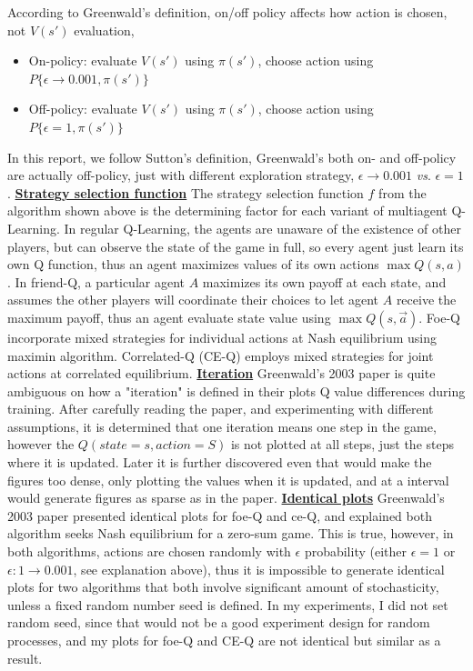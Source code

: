 \documentclass[10pt]{article}
\begin{document}
\noindent
According to Greenwald's definition\cite{GreenwaldCorrelatedQLearning2005}, on/off policy affects how action is chosen, not $V(s')$ evaluation,
\begin{itemize}
  \item On-policy: evaluate $V(s')$ using $\pi(s')$, choose action using $P\{\epsilon\rightarrow 0.001, \pi(s')\}$
  \item Off-policy: evaluate $V(s')$ using $\pi(s')$, choose action using $P\{\epsilon=1, \pi(s')\}$
\end{itemize}
 

In this report, we follow Sutton's definition, Greenwald's both on- and off-policy are actually off-policy, just with different exploration strategy, $\epsilon\rightarrow 0.001$ \textit{vs}. $\epsilon=1$.
\bigbreak
\noindent
\ul{\textbf{Strategy selection function}} The strategy selection function $f$ from the algorithm shown above is the determining factor for each variant of multiagent Q-Learning. In regular Q-Learning, the agents are unaware of the existence of other players, but can observe the state of the game in full, so every agent just learn its own Q function, thus an agent maximizes values of its own actions $\max Q(s,a)$. In friend-Q\cite{LittmanFriendorFoeQlearningGeneralSum2001}, a particular agent $A$ maximizes its own payoff at each state, and assumes the other players will coordinate their choices to let agent $A$ receive the maximum payoff, thus an agent evaluate state value using $\max Q(s,\vec{a})$. Foe-Q\cite{LittmanFriendorFoeQlearningGeneralSum2001} incorporate mixed strategies for individual actions at Nash equilibrium using maximin algorithm. Correlated-Q (CE-Q)\cite{GreenwaldCorrelatedQLearning2003} employs mixed strategies for joint actions at correlated equilibrium.
\bigbreak
\noindent
\ul{\textbf{Iteration}} Greenwald's 2003 paper\cite{GreenwaldCorrelatedQLearning2003} is quite ambiguous on how a "iteration" is defined in their plots Q value differences during training. After carefully reading the paper, and experimenting with different assumptions, it is determined that one iteration means one step in the game, however the $Q(state=s,action=S)$ is not plotted at all steps, just the steps where it is updated. Later it is further discovered even that would make the figures too dense, only plotting the values when it is updated, and at a interval would generate figures as sparse as in the paper.
\bigbreak
\noindent
\ul{\textbf{Identical plots}} Greenwald's 2003 paper\cite{GreenwaldCorrelatedQLearning2003} presented identical plots for foe-Q and ce-Q, and explained both algorithm seeks Nash equilibrium for a zero-sum game. This is true, however, in both algorithms, actions are chosen randomly with $\epsilon$ probability (either $\epsilon=1$ or $\epsilon:1\rightarrow0.001$, see explanation above), thus it is impossible to generate identical plots for two algorithms that both involve significant amount of stochasticity, unless a fixed random number seed is defined. In my experiments, I did not set random seed, since that would not be a good experiment design for random processes, and my plots for foe-Q and CE-Q are not identical but similar as a result.
\end{document}
